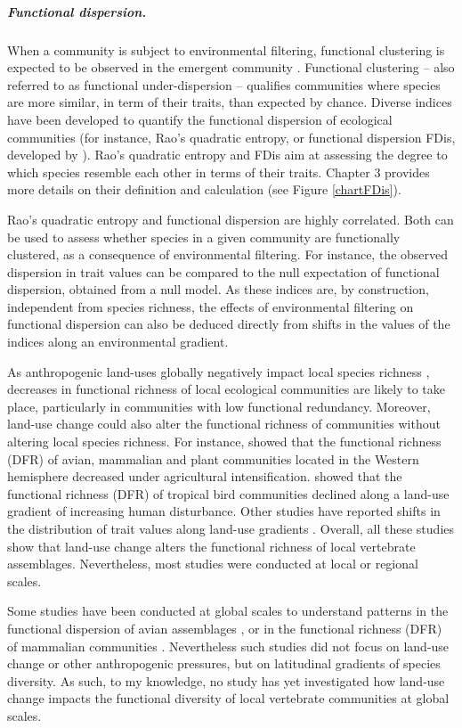 \subparagraph{Functional dispersion.}
When a community is subject to environmental filtering, functional clustering is expected to be observed in the emergent community \citep{Wong2018, Cadotte2017}. Functional clustering -- also referred to as functional under-dispersion -- qualifies communities where species are more similar, in term of their traits, than expected by chance. Diverse indices have been developed to quantify the functional dispersion of ecological communities (for instance, Rao's quadratic entropy, or functional dispersion FDis, developed by \citet{Laliberte2010}). Rao's quadratic entropy and FDis aim at assessing the degree to which species resemble each other in terms of their traits. Chapter 3 provides more details on their definition and calculation (see Figure \ref{chartFDis}). 

Rao's quadratic entropy and functional dispersion are highly correlated. Both can be used to assess whether species in a given community are functionally clustered, as a consequence of environmental filtering. For instance, the observed dispersion in trait values can be compared to the null expectation of functional dispersion, obtained from a null model. As these indices are, by construction, independent from species richness, the effects of environmental filtering on functional dispersion can also be deduced directly from shifts in the values of the indices along an environmental gradient. 

As anthropogenic land-uses globally negatively impact local species richness \citep{Newbold2015}, decreases in functional richness of local ecological communities are likely to take place, particularly in communities with low functional redundancy. Moreover, land-use change could also alter the functional richness of communities without altering local species richness. For instance, \citet{Flynn2009} showed that the functional richness (DFR) of avian, mammalian and plant communities located in the Western hemisphere decreased under agricultural intensification. \citet{Chapman2018} showed that the functional richness (DFR) of tropical bird communities declined along a land-use gradient of increasing human disturbance. Other studies have reported shifts in the distribution of trait values along land-use gradients \citep{LaSorte2018, Rapacciuolo2017}. Overall, all these studies show that land-use change alters the functional richness of local vertebrate assemblages. Nevertheless, most studies were conducted at local or regional scales.

Some studies have been conducted at global scales to understand patterns in the functional dispersion of avian assemblages \citep{Cooke2019}, or in the functional richness (DFR) of mammalian communities \citep{Safi2011}. Nevertheless such studies did not focus on land-use change or other anthropogenic pressures, but on latitudinal gradients of species diversity. As such, to my knowledge, no study has yet investigated how land-use change impacts the functional diversity of local vertebrate communities at global scales. 

